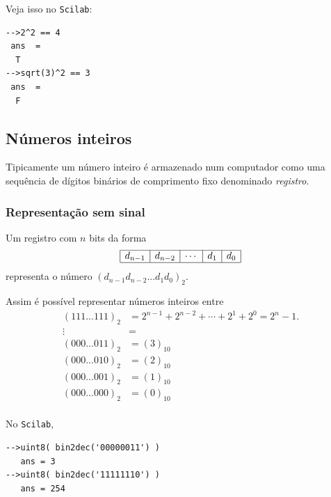 \documentclass[main.tex]{subfiles}
\begin{document}
\ifisscilab
Veja isso no \verb+Scilab+:
\begin{verbatim}
-->2^2 == 4
 ans  =
  T  
-->sqrt(3)^2 == 3
 ans  =
  F  
\end{verbatim}
\fi

\subsection{Números inteiros}

Tipicamente um número inteiro é armazenado num computador como uma sequência de dígitos binários de comprimento fixo denominado \emph{registro}.

\subsubsection{Representação sem sinal}
Um registro com $n$ bits da forma
\begin{equation*}
\begin{array}{|c|c|c|c|c|} \hline
d_{n-1}&d_{n-2}&\cdots&d_1&d_0\\\hline
\end{array}  
\end{equation*}
representa o número $(d_{n-1}d_{n-2}...d_1d_0)_2$. 

Assim é possível representar números inteiros entre
\begin{equation*}
\begin{array}{cl}
  (111...111)_2 & = 2^{n-1}+2^{n-2}+\cdots+2^1+2^0=2^n-1.\\
    \vdots      & = \\
  (000...011)_2 &= (3)_{10} \\
  (000...010)_2 &= (2)_{10} \\
  (000...001)_2 &= (1)_{10} \\
  (000...000)_2 & =(0)_{10} \\
\end{array}
\end{equation*}

\ifisscilab
\begin{ex}
  No \verb+Scilab+,
\begin{verbatim}
-->uint8( bin2dec('00000011') )
   ans = 3
-->uint8( bin2dec('11111110') )
   ans = 254
\end{verbatim}
\end{ex}
\fi
\end{document}
